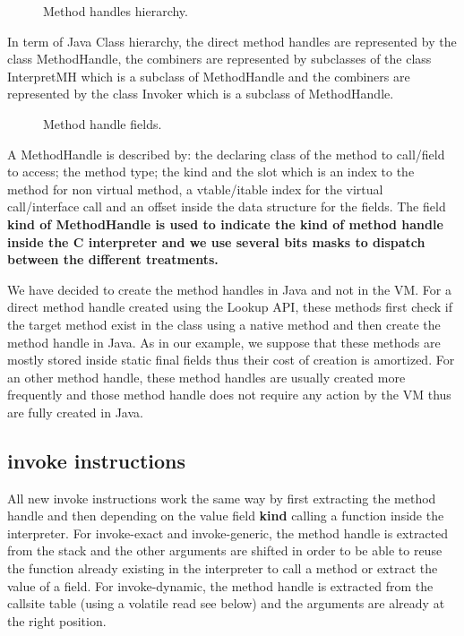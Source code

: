 \documentclass{sig-alternate}
\begin{document}
      \begin{figure}[!h]
        \centering \resizebox{\linewidth}{!}{}
        \caption{Method handles hierarchy.}
        \label{mhHier}
      \end{figure}

      In term of Java Class hierarchy, the direct method handles are represented by the class MethodHandle,
      the combiners are represented by subclasses of the class InterpretMH which is a subclass of MethodHandle
      and the combiners are represented by the class Invoker which is a subclass of MethodHandle.

      \begin{figure}[!h]
        \centering \vspace{-1.5em}
        \caption{Method handle fields.}
        \label{mhFields}
      \end{figure}

      A MethodHandle is described by: the declaring class of the method to call/field to access;
      the method type; the kind and the slot which is an index to the method for non virtual method,
      a vtable/itable index for the virtual call/interface call and an offset inside the data structure
      for the fields.
      The field \bf{kind} of MethodHandle is used to indicate the kind of method handle inside the C interpreter and we use
      several bits masks to dispatch between the different treatments.

      We have decided to create the method handles in Java and not in the VM.
      For a direct method handle created using the Lookup API, these methods first check
      if the target method exist in the class using a native method and then create
      the method handle in Java. As in our example, we suppose that these methods are
      mostly stored inside static final fields thus their cost of creation is amortized.
      For an other method handle, these method handles are usually created more frequently
      and those method handle does not require any action by the VM thus are fully created in Java.

    \subsection{invoke instructions}
      All new invoke instructions work the same way by first extracting the method handle
      and then depending on the value field {\bf kind} calling a function inside the interpreter.
      For invoke-exact and invoke-generic, the method handle is extracted from the stack and
      the other arguments are shifted in order to be able to reuse the function already existing in the interpreter
      to call a method or extract the value of a field.
      For invoke-dynamic, the method handle is extracted from the callsite table (using a volatile read see below)
      and the arguments are already at the right position.
\end{document}
